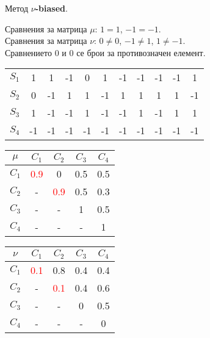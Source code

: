 \documentclass{beamer}
\begin{document}
\begin{frame}
Метод \textbf{$\nu$-biased}.

\bigskip
Сравнения за матрица $\mu$: $1=1$, $-1=-1$.\\
Сравнения за матрица $\nu$: $0\neq0$, $-1\neq1$, $1\neq-1$.\\
Сравнението $0$ и $0$ се брои за противозначен елемент.

\begin{center}
\begin{tabular}{c|cccccccccc}
& & & & & & & & & & \\
\hline $S_1$ & 1 & 1 & -1 & 0 & 1 & -1 & -1 & -1 & -1 & 1 \\
$S_2$ & 0 & -1 & 1 & 1 & -1 & 1 & 1 & 1 & 1 & -1 \\
$S_3$ & 1 & -1 & -1 & 1 & -1 & -1 & 1 & -1 & 1 & 1 \\
$S_4$ & -1 & -1 & -1 & -1 & -1 & -1 & -1 & -1 & -1 & -1
\end{tabular}
\end{center}

\begin{center}
\begin{minipage}[b]{0.4\linewidth}
\begin{tabular}{c|cccc}
$\mu$ & $C_1$ & $C_2$ & $C_3$ & $C_4$ \\
\hline $C_1$ & \textcolor{red}{0.9} & 0 & 0.5 & 0.5 \\
$C_2$ & - & \textcolor{red}{0.9} & 0.5 & 0.3 \\
$C_3$ & - & - & 1 & 0.5 \\
$C_4$ & - & - & - & 1
\end{tabular}
\end{minipage}
\begin{minipage}[b]{0.4\linewidth}
\begin{tabular}{c|cccc}
$\nu$ & $C_1$ & $C_2$ & $C_3$ & $C_4$ \\
\hline $C_1$ & \textcolor{red}{0.1} & 0.8 & 0.4 & 0.4 \\
$C_2$ & - & \textcolor{red}{0.1} & 0.4 & 0.6 \\
$C_3$ & - & - & 0 & 0.5 \\
$C_4$ & - & - & - & 0
\end{tabular}
\end{minipage}
\end{center}
\end{frame}
\end{document}
